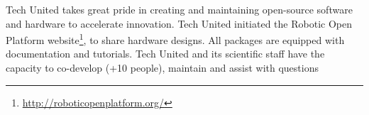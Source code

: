 Tech United takes great pride in creating and maintaining open-source software and hardware to accelerate innovation. Tech United initiated the Robotic Open Platform website\footnote{\url{http://roboticopenplatform.org/}}, to share hardware designs. All packages are equipped with documentation and tutorials. Tech United and its scientific staff have the capacity to co-develop (+10 people), maintain and assist with questions